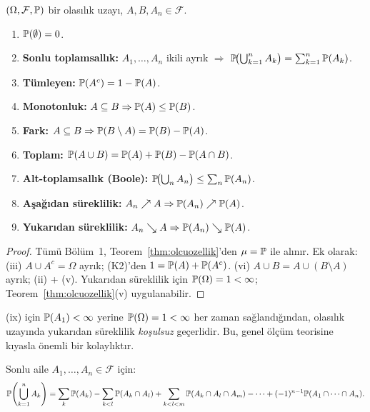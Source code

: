 \begin{teorem}\label{thm:olasiliktemel}
$(\Omega, \mathcal{F}, \mathbb{P})$ bir olasılık uzayı, $A, B, A_n \in \mathcal{F}$.
\begin{enumerate}[label=(\roman*)]
  \item $\mathbb{P}(\emptyset) = 0$.
  \item \textbf{Sonlu toplamsallık:} $A_1,\ldots,A_n$ ikili ayrık $\Rightarrow$
        $\mathbb{P}\!\bigl(\bigcup_{k=1}^n A_k\bigr) = \sum_{k=1}^n \mathbb{P}(A_k)$.
  \item \textbf{Tümleyen:} $\mathbb{P}(A^c) = 1 - \mathbb{P}(A)$.
  \item \textbf{Monotonluk:} $A \subseteq B \Rightarrow \mathbb{P}(A) \leq \mathbb{P}(B)$.
  \item \textbf{Fark:} $A \subseteq B \Rightarrow \mathbb{P}(B \setminus A) = \mathbb{P}(B) - \mathbb{P}(A)$.
  \item \textbf{Toplam:} $\mathbb{P}(A \cup B) = \mathbb{P}(A) + \mathbb{P}(B) - \mathbb{P}(A \cap B)$.
  \item \textbf{Alt-toplamsallık (Boole):}
        $\mathbb{P}\!\bigl(\bigcup_n A_n\bigr) \leq \sum_n \mathbb{P}(A_n)$.
  \item \textbf{Aşağıdan süreklilik:} $A_n \nearrow A \Rightarrow \mathbb{P}(A_n) \nearrow \mathbb{P}(A)$.
  \item \textbf{Yukarıdan süreklilik:} $A_n \searrow A \Rightarrow \mathbb{P}(A_n) \searrow \mathbb{P}(A)$.
\end{enumerate}
\end{teorem}

\begin{proof}
Tümü Bölüm~1, Teorem~\ref{thm:olcuozellik}'den $\mu = \mathbb{P}$ ile alınır.
Ek olarak: (iii) $A \cup A^c = \Omega$ ayrık; (K2)'den $1 = \mathbb{P}(A)+\mathbb{P}(A^c)$.
(vi) $A \cup B = A \cup (B \setminus A)$ ayrık; (ii) + (v).
Yukarıdan süreklilik için $\mathbb{P}(\Omega)=1<\infty$; Teorem~\ref{thm:olcuozellik}(v)
uygulanabilir.
\end{proof}

\begin{notkutu}
(ix) için $\mathbb{P}(A_1) < \infty$ yerine $\mathbb{P}(\Omega) = 1 < \infty$ her zaman
sağlandığından, olasılık uzayında yukarıdan süreklilik \emph{koşulsuz} geçerlidir.
Bu, genel ölçüm teorisine kıyasla önemli bir kolaylıktır.
\end{notkutu}

\begin{teorem}\label{thm:poincare}
Sonlu aile $A_1, \ldots, A_n \in \mathcal{F}$ için:
\[
  \mathbb{P}\!\left(\bigcup_{k=1}^n A_k\right)
  = \sum_{k} \mathbb{P}(A_k)
  - \sum_{k < l} \mathbb{P}(A_k \cap A_l)
  + \sum_{k < l < m} \mathbb{P}(A_k \cap A_l \cap A_m)
  - \cdots
  + (-1)^{n-1} \mathbb{P}(A_1 \cap \cdots \cap A_n).
\]
\end{teorem}

